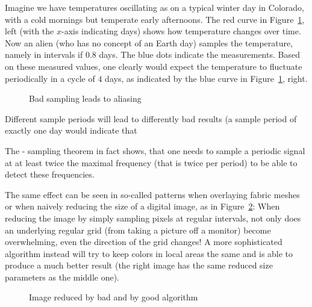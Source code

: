 Imagine we  have temperatures oscillating as on a typical winter day in
Colorado, with a cold mornings but temperate early afternoons. The red curve
in Figure~\ref{figalias}, left (with the $x$-axis indicating days) shows
how temperature changes over time. Now an alien (who has no concept of an
Earth day) samples the temperature, namely in intervals if $0.8$ days. The
blue dots indicate the measurements. Based on these measured values, one
clearly would expect the temperature to fluctuate periodically in a cycle of
$4$ days, as indicated by the blue curve in Figure~\ref{figalias}, right.
\begin{figure}
\begin{center}
\quad
\end{center}
\caption{Bad sampling leads to aliasing}
\label{figalias}
\end{figure}
Different sample periods will lead to differently bad results (a sample
period of exactly one day would indicate that 

The - sampling theorem in fact shows, that
one needs to sample a periodic signal at at least twice the maximal
frequency (that is twice per period) to be able to detect these frequencies.


The same effect can be seen in so-called  patterns when
overlaying fabric meshes or when naively reducing the size of a digital
image, as in Figure~\ref{figscreenpic}: When reducing the image by simply
sampling pixels at regular intervals, not only does an underlying regular
grid (from taking a picture off a monitor) become overwhelming, even the
direction of the grid changes! A more sophisticated algorithm instead will
try to keep colors in local areas the same and is able to produce a much
better result (the right image has the same reduced size parameters as the
middle one).
\begin{figure}
\begin{center}
\quad
\quad
\end{center}
\caption{Image reduced by bad and by good algorithm}
\label{figscreenpic}
\end{figure}

